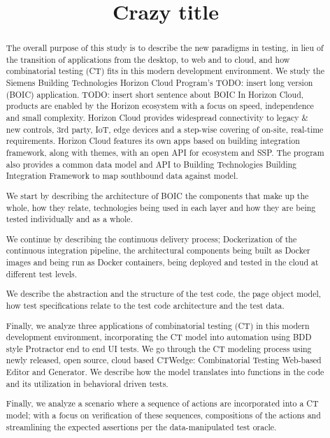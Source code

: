 \documentclass[conference]{IEEEtran}
\newcommand{\todo}[1]{}
\renewcommand{\todo}[1]{{\color{red} TODO: {#1}}}
\begin{document}
\title{Crazy title}


\author{
}

\maketitle


\begin{abstract}
The overall purpose of this study is to describe the new paradigms in testing,
in lieu of the transition of applications from the desktop, to web and to cloud, and how combinatorial testing (CT) fits in this modern development environment. 
We study the Siemens Building Technologies Horizon Cloud Program's \todo{insert long version} (BOIC) application. \todo{ insert short sentence about BOIC}
In Horizon Cloud, products are enabled by the Horizon ecosystem with a focus on speed, independence and small complexity.
Horizon Cloud provides widespread connectivity to legacy \& new controls, 3rd party, IoT, 
edge devices and a step-wise covering of on-site, real-time requirements. 
Horizon Cloud features its own apps based on building integration framework, along with themes, with an open API for ecosystem and SSP. 
The program also provides a common data model and API to Building Technologies Building Integration Framework to map southbound data against model.

We start by describing the architecture of BOIC the components that make up the whole, how they relate, 
technologies being used in each layer and how they are being tested individually and as a whole. 	

We continue by describing the continuous delivery process; Dockerization of the continuous integration pipeline,
the architectural components being built as Docker images and being run as Docker containers, being deployed and tested in the cloud at different test levels. 

We describe the abstraction and the structure of the test code, the page object model, 
how test specifications relate to the test code architecture and the test data. 

Finally, we analyze three applications of combinatorial testing (CT) in this modern development environment,
incorporating the CT model into automation using BDD style Protractor end to end UI tests. 
We go through the CT modeling process using newly released, open source, cloud based CTWedge: Combinatorial Testing Web-based Editor and Generator. 
We describe how the model translates into functions in the code and its utilization in behavioral driven tests.

Finally, we analyze a scenario where a sequence of actions are incorporated into a CT model;
with a focus on verification of these sequences, compositions of the actions and streamlining the expected assertions per the data-manipulated test oracle.

\end{abstract}
\end{document}
